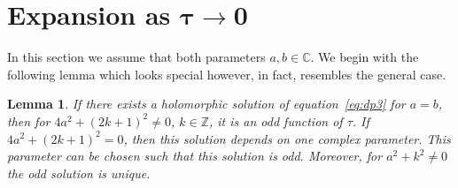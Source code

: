 \documentclass[pdftex]{sigma}
\numberwithin{equation}{section}
\newtheorem{Lemma}[Theorem]{Lemma}
\begin{document}
\section[Expansion as $\tau\to0$]{Expansion as $\boldsymbol{\tau\to0}$}\label{sec:Taylor}
In this section we assume that both parameters $a,b\in\mathbb{C}$. We begin with the following lemma which looks
special however, in fact, resembles the general case.
\begin{Lemma}\label{lem:odd}
If there exists a holomorphic solution of equation~\eqref{eq:dp3} for $a=b$, then for $4a^2+(2k+1)^2\neq0$,
$k\in\mathbb Z$, it is an odd function of $\tau$. If $4a^2+(2k+1)^2=0$, then this solution depends on one complex parameter. This parameter
can be chosen such that this solution is odd. Moreover, for $a^2+k^2\neq0$ the odd solution is unique.
\end{Lemma}
\end{document}
